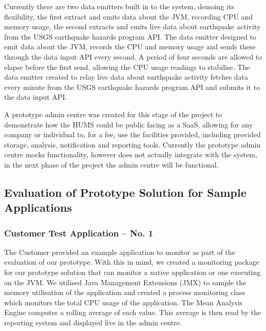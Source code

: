 \documentclass[10pt,a4paper]{article}
\begin{document}
Currently there are two data emitters built in to the system, demoing its flexibility, the first extract and emits data about the JVM, recording CPU and memory usage, the second extracts and emits live data about earthquake activity from the USGS earthquake hazards program API. %
The data emitter designed to emit data about the JVM, records the CPU and memory usage and sends these through the data input API every second. A period of four seconds are allowed to elapse before the first send, allowing the CPU usage readings to stabilise. The data emitter created to relay live data about earthquake activity fetches data every minute from the USGS earthquake hazards program API and submits it to the data input API.




A prototype admin centre was created for this stage of the project to demonstrate how the HUMS could be public facing as a SaaS, allowing for any company or individual to, for a fee, use the facilities provided, including provided storage, analysis, notification and reporting tools. Currently the prototype admin centre mocks functionality, however does not actually integrate with the system, in the next phase of the project the admin centre will be functional.

\subsection{Evaluation of Prototype Solution for Sample Applications}
\label{sec:prototype-evaluation}

\subsubsection{Customer Test Application -- No. 1}
The Customer provided an example application to monitor as part of the
evaluation of our prototype. With this in mind, we created a monitoring 
package for our prototype solution that can monitor a native application
or one executing on the JVM. We utilised Java Management 
Extensions (JMX) to sample the memory utilisation of the application and
created a process monitoring class which monitors the total
CPU usage of the application. The Mean Analysis Engine computes a 
rolling average of each value. This average is then read 
by the reporting system and displayed live in the admin centre.
\end{document}
